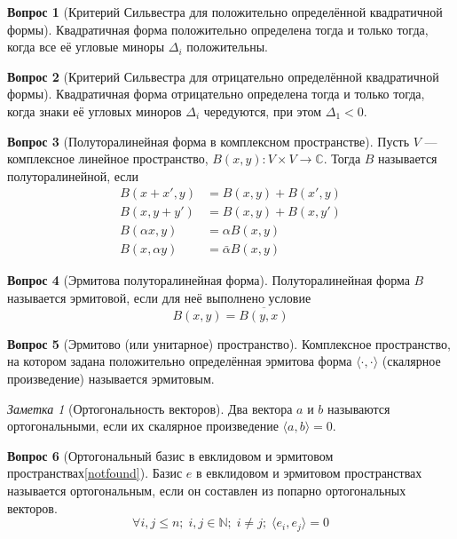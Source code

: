 \documentclass[a4paper,11pt]{article}
\theoremstyle{remark}
\newtheorem*{note}{Заметка}
\theoremstyle{definition}
\newtheorem{question}{Вопрос}
\begin{document}
\begin{question}[Критерий Сильвестра для положительно определённой квадратичной формы]
Квадратичная форма положительно определена тогда и только тогда, когда все её угловые миноры \(\Delta_i\) положительны.
\end{question}

\begin{question}[Критерий Сильвестра для отрицательно определённой квадратичной формы]
Квадратичная форма отрицательно определена тогда и только тогда, когда знаки её угловых миноров \(\Delta_i\) чередуются, при этом \(\Delta_1 < 0\).
\end{question}


\begin{question}[Полуторалинейная форма в комплексном пространстве]
Пусть \(V\) --- комплексное линейное пространство, \(B(x,y): V \times V \rightarrow \mathbb{C}\). Тогда \(B\) называется полуторалинейной, если
\begin{align*}
	B(x + x', y) &= B(x, y) + B(x', y) \\
	B(x, y + y') &= B(x, y) + B(x, y') \\
	B(\alpha{}x, y) &= \alpha{}B(x, y) \\
	B(x, \alpha{}y) &= \bar{\alpha}B(x, y)
\end{align*}
\end{question}


\begin{question}[Эрмитова полуторалинейная форма]
Полуторалинейная форма \(B\) называется эрмитовой, если для неё выполнено условие
\begin{equation*}
	B(x, y) = \overline{B(y, x)}
\end{equation*}
\end{question}


\begin{question}[Эрмитово (или унитарное) пространство]
Комплексное пространство, на котором задана положительно определённая эрмитова форма \(\langle \cdot , \cdot \rangle\) (скалярное произведение) называется эрмитовым. 
\end{question}

\begin{note}[Ортогональность векторов]
Два вектора \(a\) и \(b\) называются ортогональными, если их скалярное произведение \(\langle a , b \rangle = 0\).
\end{note}

\begin{question}[Ортогональный базис в евклидовом и эрмитовом пространствах\cref{notfound}]
Базис \(e\) в евклидовом и эрмитовом пространствах называется ортогональным, если он составлен из попарно ортогональных векторов.
\begin{equation*}
	\forall i,j \leqslant n;\; i, j \in \mathbb{N};\; i \neq j;\; \langle e_i, e_j \rangle = 0
\end{equation*}
\end{question}
\end{document}
